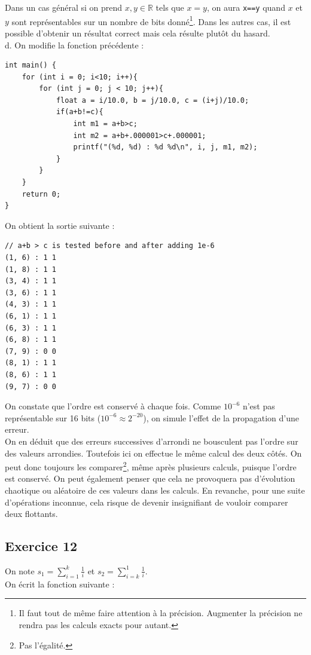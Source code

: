 \documentclass[11pt, a4 paper]{article}
\begin{document}
Dans un cas général si on prend $x, y \in \mathbb{R}$ tels que $x=y$, on aura \texttt{x==y} quand $x$ et $y$ sont représentables sur un nombre de bits donné\footnote{Il faut tout de même faire attention à la précision. Augmenter la précision ne rendra pas les calculs exacts pour autant.}. Dans les autres cas, il est possible d'obtenir un résultat correct mais cela résulte plutôt du hasard.\\

d. On modifie la fonction précédente :
\begin{lstlisting}[style=CStyle]
int main() {
    for (int i = 0; i<10; i++){
        for (int j = 0; j < 10; j++){
            float a = i/10.0, b = j/10.0, c = (i+j)/10.0;
            if(a+b!=c){
                int m1 = a+b>c;
                int m2 = a+b+.000001>c+.000001;
                printf("(%d, %d) : %d %d\n", i, j, m1, m2);
            }
        }
    } 
    return 0;
}
\end{lstlisting}

On obtient la sortie suivante :
\begin{lstlisting}[style=CStyle]
// a+b > c is tested before and after adding 1e-6
(1, 6) : 1 1
(1, 8) : 1 1
(3, 4) : 1 1
(3, 6) : 1 1
(4, 3) : 1 1
(6, 1) : 1 1
(6, 3) : 1 1
(6, 8) : 1 1
(7, 9) : 0 0
(8, 1) : 1 1
(8, 6) : 1 1
(9, 7) : 0 0
\end{lstlisting}
On constate que l'ordre est conservé à chaque fois. Comme $10^{-6}$ n'est pas représentable sur 16 bits ($10^{-6} \approx 2^{-20}$), on simule l'effet de la propagation d'une erreur.\\
On en déduit que des erreurs successives d'arrondi ne bousculent pas l'ordre sur des valeurs arrondies. Toutefois ici on effectue le même calcul des deux côtés. On peut donc toujours les comparer\footnote{Pas l'égalité.}, même après plusieurs calculs, puisque l'ordre est conservé. On peut également penser que cela ne provoquera pas d'évolution chaotique ou aléatoire de ces valeurs dans les calculs. En revanche, pour une suite d'opérations inconnue, cela risque de devenir insignifiant de vouloir comparer deux flottants.

\subsection{Exercice 12}
On note $s_1 = \displaystyle{\sum_{i=1}^{k} \frac{1}{i}}$ et $s_2 = \displaystyle{\sum_{i=k}^{1} \frac{1}{i}}$.\\
On écrit la fonction suivante :
\end{document}
